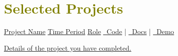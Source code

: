 
\section{\textcolor{olive}{\textbf{Selected Projects}}}
    \resumeSubHeadingListStart

    \resumeSubheading
        {\underline{Project Name}}
        {\underline{Time Period}}
        {\underline{Role}} %
        {\href{https://github.com/1chooo/1chooo.com}{\underline{\faGithub\ Code}} | \href{https://docs.1chooo.com}{\underline{{\faBook}\ Docs}} | \href{https://www.1chooo.com}{\underline{\faDesktop\ Demo}}}

        \resumeItemListStart
            \item {\underline{Details of the project you have completed.}}
        \resumeItemListEnd

    \resumeSubHeadingListEnd
